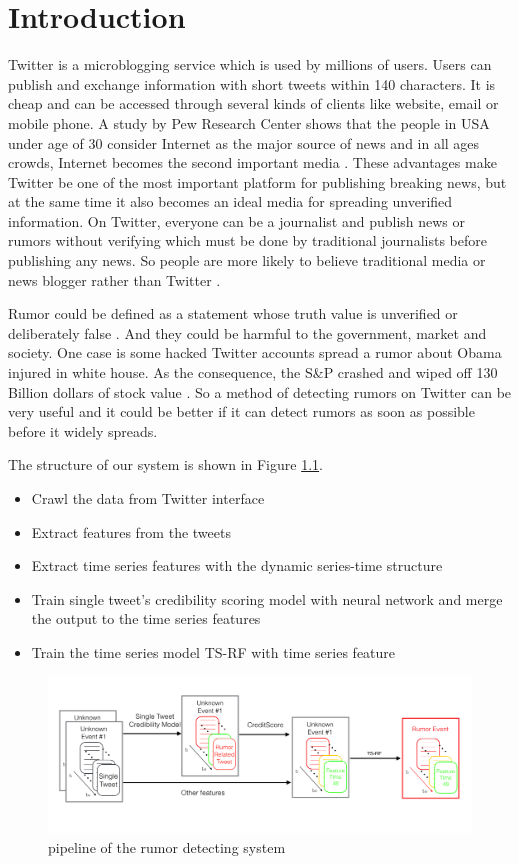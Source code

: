 \chapter{Introduction} %
\label{cha:introduction}
Twitter is a microblogging service which is used by millions of users. Users can publish and exchange information with short tweets within 140 characters. It is cheap and can be accessed through several kinds of clients like website, email or mobile phone. A study by Pew Research Center shows that the people in USA under age of 30 consider Internet as the major source of news and in all ages crowds, Internet becomes the second important media \cite{kohut2008internet}. These advantages make Twitter be one of the most important platform for publishing breaking news, but at the same time it also becomes an ideal media for spreading unverified information. On Twitter, everyone can be a journalist and publish news or rumors without verifying which must be done by traditional journalists before publishing any news. So people are more likely to believe traditional media or news blogger rather than Twitter \cite{thomson2012trusting}.

 Rumor could be defined as a statement whose truth value is unverified or deliberately false \cite{qazvinian2011rumor}. And they could be harmful to the government, market and society. One case is some hacked Twitter accounts spread a rumor about Obama injured in white house. As the consequence, the S\&P crashed and wiped off 130 Billion dollars of stock value \cite{matthews2013does}. So a method of detecting rumors on Twitter can be very useful and it could be better if it can detect rumors as soon as possible before it widely spreads.    
 
 The structure of our system is shown in Figure \ref{fig:pipeline}.
  \begin{itemize}
  \item Crawl the data from Twitter interface
  \item Extract features from the tweets 
  \item Extract time series features with the dynamic series-time structure 
  \item Train single tweet's credibility scoring model with neural network and merge the output to the time series features
  \item  Train the time series model TS-RF with time series feature
 \end{itemize}
 \begin{figure}[!h]
\centering
\includegraphics[width=\columnwidth]{images/structuremodel.png}
\caption{ pipeline of the rumor detecting system }
\label{fig:pipeline}
\end{figure}

